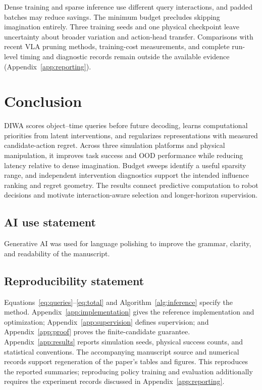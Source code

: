 \documentclass{article}
\begin{document}
Dense training and sparse inference use different query interactions, and padded batches may reduce savings. The minimum budget precludes skipping imagination entirely. Three training seeds and one physical checkpoint leave uncertainty about broader variation and action-head transfer. Comparisons with recent VLA pruning methods, training-cost measurements, and complete run-level timing and diagnostic records remain outside the available evidence (Appendix~\ref{app:reporting}).

\section{Conclusion}
DIWA scores object--time queries before future decoding, learns computational priorities from latent interventions, and regularizes representations with measured candidate-action regret. Across three simulation platforms and physical manipulation, it improves task success and OOD performance while reducing latency relative to dense imagination. Budget sweeps identify a useful sparsity range, and independent intervention diagnostics support the intended influence ranking and regret geometry. The results connect predictive computation to robot decisions and motivate interaction-aware selection and longer-horizon supervision.

\clearpage
\subsection*{AI use statement}
Generative AI was used for language polishing to improve the grammar, clarity, and readability of the manuscript.

\subsection*{Reproducibility statement}
Equations~\eqref{eq:queries}--\eqref{eq:total} and Algorithm~\ref{alg:inference} specify the method. Appendix~\ref{app:implementation} gives the reference implementation and optimization; Appendix~\ref{app:supervision} defines supervision; and Appendix~\ref{app:proof} proves the finite-candidate guarantee. Appendix~\ref{app:results} reports simulation seeds, physical success counts, and statistical conventions. The accompanying manuscript source and numerical records support regeneration of the paper's tables and figures. This reproduces the reported summaries; reproducing policy training and evaluation additionally requires the experiment records discussed in Appendix~\ref{app:reporting}.
\end{document}
